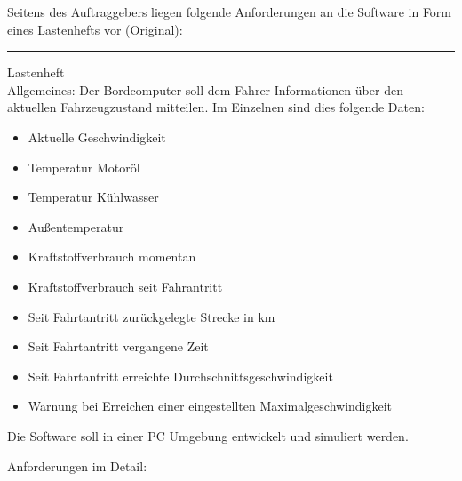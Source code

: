 \documentclass[a4paper,12pt]{article}
\begin{document}
Seitens des Auftraggebers liegen folgende Anforderungen an die Software in Form eines Lastenhefts vor (Original):\\

\noindent\rule{16cm}{0.4pt}
Lastenheft\\

Allgemeines:
Der Bordcomputer soll dem Fahrer Informationen über den aktuellen Fahrzeugzustand mitteilen. Im Einzelnen sind dies folgende Daten:

\begin{itemize}

\item Aktuelle Geschwindigkeit 
\item Temperatur Motoröl
\item Temperatur Kühlwasser
\item Außentemperatur 
\item Kraftstoffverbrauch momentan 
\item Kraftstoffverbrauch seit Fahrantritt
\item Seit Fahrtantritt zurückgelegte Strecke in km
\item Seit Fahrtantritt vergangene Zeit
\item Seit Fahrtantritt erreichte Durchschnittsgeschwindigkeit 
\item Warnung bei Erreichen einer eingestellten Maximalgeschwindigkeit

\end{itemize}
 
Die Software soll in einer PC Umgebung entwickelt und simuliert werden.

Anforderungen im Detail:
\end{document}
